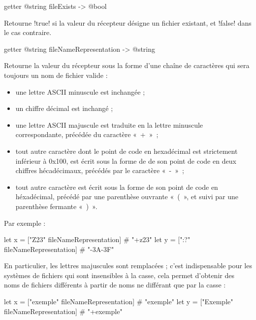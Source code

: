 
\begin{galgas4box}
getter @string fileExists -> @bool
\end{galgas4box}

Retourne \ggsq!true! si la valeur du récepteur désigne un fichier existant, et \ggsq!false! dans le cas contraire.







\begin{galgas4box}
getter @string fileNameRepresentation -> @string
\end{galgas4box}

Retourne la valeur du récepteur sous la forme d'une chaîne de caractères qui sera toujours un nom de fichier valide :
\begin{itemize}
\item une lettre ASCII minuscule est inchangée ;
\item un chiffre décimal est inchangé ;
\item une lettre ASCII majuscule est traduite en la lettre minuscule correspondante, précédée du caractère «~+~»~;
\item tout autre caractère dont le point de code en hexadécimal est strictement inférieur à 0x100, est écrit sous la forme de de son point de code en deux chiffres hécadécimaux, précédés par le caractère «~-~»~;
\item tout autre caractère est écrit sous la forme de son point de code en héxadécimal, précédé par une parenthèse ouvrante «~(~», et suivi par une parenthèse fermante «~)~».
\end{itemize}

Par exemple :
\begin{galgas4}
let x = ["Z23" fileNameRepresentation] # "+z23"
let y = [":?" fileNameRepresentation] # "-3A-3F"
\end{galgas4}

En particulier, les lettres majuscules sont remplacées ; c'est indispensable pour les systèmes de fichiers qui sont insensibles à la casse, cela permet d'obtenir des noms de fichiers différents à partir de noms ne différant que par la casse :

\begin{galgas4}
let x = ["exemple" fileNameRepresentation] # "exemple"
let y = ["Exemple" fileNameRepresentation] # "+exemple"
\end{galgas4}






